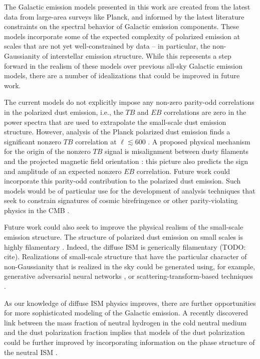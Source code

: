 \documentclass[twocolumn]{aastex631}
\begin{document}
The Galactic emission models presented in this work are created from the latest data from large-area surveys like Planck, and informed by the latest literature constraints on the spectral behavior of Galactic emission components. These models incorporate some of the expected complexity of polarized emission at scales that are not yet well-constrained by data -- in particular, the non-Gaussianity of interstellar emission structure. While this represents a step forward in the realism of these models over previous all-sky Galactic emission models, there are a number of idealizations that could be improved in future work. 

The current models do not explicitly impose any non-zero parity-odd correlations in the polarized dust emission, i.e., the $TB$ and $EB$ correlations are zero in the power spectra that are used to extrapolate the small-scale dust emission structure. However, analysis of the Planck polarized dust emission finds a significant nonzero $TB$ correlation at $\ell \lesssim 600$ \citep{planck2016-l11A, Weiland:2020}. A proposed physical mechanism for the origin of the nonzero $TB$ signal is misalignment between dusty filaments and the projected magnetic field orientation \citep{Huffenberger:2020, Clark:2021, Cukierman:2023}: this picture also predicts the sign and amplitude of an expected nonzero $EB$ correlation. Future work could incorporate this parity-odd contribution to the polarized dust emission. Such models would be of particular use for the development of analysis techniques that seek to constrain signatures of cosmic birefringence or other parity-violating physics in the CMB \citep[e.g.,][]{Minami:2020, Eskilt:2022}.

Future work could also seek to improve the physical realism of the small-scale emission structure. The structure of polarized dust emission on small scales is highly filamentary \citep[e.g.,][]{Clark:2015, Halal:2024}. Indeed, the diffuse ISM is generically filamentary (TODO: cite). Realizations of small-scale structure that have the particular character of non-Gaussianity that is realized in the sky could be generated using, for example, generative adversarial neural networks \citep{Krachmalnicoff:2021}, or scattering-transform-based techniques \citep{Regaldo-SaintBlancard:2020}.

As our knowledge of diffuse ISM physics improves, there are further opportunities for more sophisticated modeling of the Galactic emission. A recently discovered link between the mass fraction of neutral hydrogen in the cold neutral medium and the dust polarization fraction implies that models of the dust polarization could be further improved by incorporating information on the phase structure of the neutral ISM \citep{Lei:2024}.   
\end{document}
